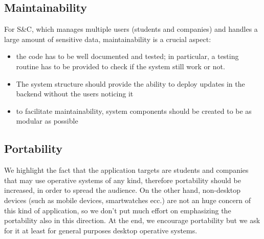 		\subsection{Maintainability}
			For S\&C, which manages multiple users (students and companies) and handles a large amount of sensitive data, maintainability is a crucial aspect:
			\begin{itemize}
				\item the code has to be well documented and tested; in particular, a testing routine has to be provided to check if the system still work or not.
				\item The system structure should provide the ability to deploy updates in the backend without the users noticing it
				\item to facilitate maintainability, system components should be created to be as modular as possible
			\end{itemize}
			
			
		\subsection{Portability}
			We highlight the fact that the application targets are students and companies that may use operative systems of any kind, therefore portability should be increased, in order to spread the audience. On the other hand, non-desktop devices (such as mobile devices, smartwatches ecc.) are not an huge concern of this kind of application, so we don't put much effort on emphasizing the portability also in this direction. At the end, we encourage portability but we ask for it at least for general purposes desktop operative systems.